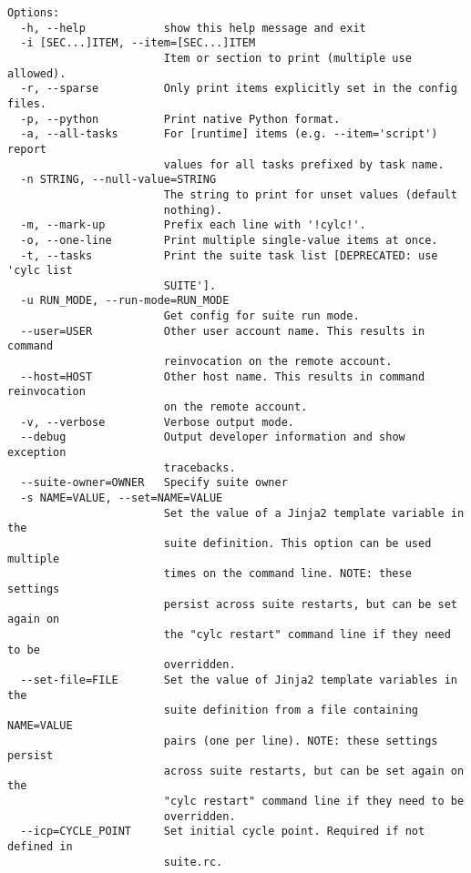 \begin{lstlisting}
Options:
  -h, --help            show this help message and exit
  -i [SEC...]ITEM, --item=[SEC...]ITEM
                        Item or section to print (multiple use allowed).
  -r, --sparse          Only print items explicitly set in the config files.
  -p, --python          Print native Python format.
  -a, --all-tasks       For [runtime] items (e.g. --item='script') report
                        values for all tasks prefixed by task name.
  -n STRING, --null-value=STRING
                        The string to print for unset values (default
                        nothing).
  -m, --mark-up         Prefix each line with '!cylc!'.
  -o, --one-line        Print multiple single-value items at once.
  -t, --tasks           Print the suite task list [DEPRECATED: use 'cylc list
                        SUITE'].
  -u RUN_MODE, --run-mode=RUN_MODE
                        Get config for suite run mode.
  --user=USER           Other user account name. This results in command
                        reinvocation on the remote account.
  --host=HOST           Other host name. This results in command reinvocation
                        on the remote account.
  -v, --verbose         Verbose output mode.
  --debug               Output developer information and show exception
                        tracebacks.
  --suite-owner=OWNER   Specify suite owner
  -s NAME=VALUE, --set=NAME=VALUE
                        Set the value of a Jinja2 template variable in the
                        suite definition. This option can be used multiple
                        times on the command line. NOTE: these settings
                        persist across suite restarts, but can be set again on
                        the "cylc restart" command line if they need to be
                        overridden.
  --set-file=FILE       Set the value of Jinja2 template variables in the
                        suite definition from a file containing NAME=VALUE
                        pairs (one per line). NOTE: these settings persist
                        across suite restarts, but can be set again on the
                        "cylc restart" command line if they need to be
                        overridden.
  --icp=CYCLE_POINT     Set initial cycle point. Required if not defined in
                        suite.rc.
\end{lstlisting}
